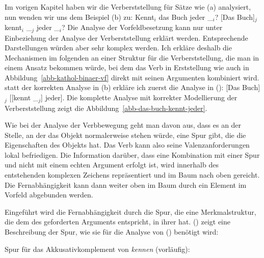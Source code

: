 Im vorigen Kapitel haben wir die Verberststellung für Sätze wie (a) analysiert, nun wenden wir uns
dem Beispiel (b) zu:
\eal
\ex Kennt$_i$ das Buch jeder \_$_i$?
\ex {}[Das Buch]$_j$ kennt$_i$ \_$_j$ jeder \_$_i$?
\zl
Die Analyse der Vorfeldbesetzung kann nur unter Einbeziehung der Analyse der Verberststellung erklärt
werden. Entsprechende Darstellungen würden aber sehr komplex werden. Ich erkläre deshalb
die Mechanismen im folgenden an einer Struktur für die Verberststellung, die man in einem
Ansatz %
bekommen würde, bei dem das Verb in Erststellung wie auch in Abbildung~\ref{abb-kathol-binaer-vf}
direkt mit seinen Argumenten kombiniert wird. \Dh statt der korrekten Analyse in (b) erkläre
ich zuerst die Analyse in ():
\ea
{}[Das Buch]$_j$ [[kennt \_$_j$] jeder].\label{ex-das-buch-kennt}
\z 
Die komplette Analyse mit korrekter Modellierung der Verberststellung zeigt
die Abbildung~\vref{abb-das-buch-kennt-jeder}.


Wie bei der Analyse der Verbbewegung geht man davon aus, dass es an der Stelle, an der
das Objekt normalerweise stehen würde, eine Spur gibt, die die Eigenschaften des Objekts
hat. Das Verb kann also seine Valenzanforderungen lokal befriedigen. Die Information darüber,
dass eine Kombination mit einer Spur und nicht mit einem echten Argument erfolgt ist,
wird innerhalb des entstehenden komplexen Zeichens repräsentiert und im Baum nach oben gereicht.
Die Fernabhängigkeit kann dann weiter oben im Baum durch ein Element im Vorfeld abgebunden werden.

Eingeführt wird die Fernabhängigkeit durch die Spur, die eine
Merkmalstruktur, die dem \localw des geforderten Arguments entspricht, in ihrer
\slashl hat. () zeigt eine Beschreibung der Spur, wie sie für die Analyse von () benötigt wird:

\eas
\label{le-spur-acc-o-kennen}%
Spur für das Akkusativkomplement von \emph{kennen} (vorläufig):\\
\zs


